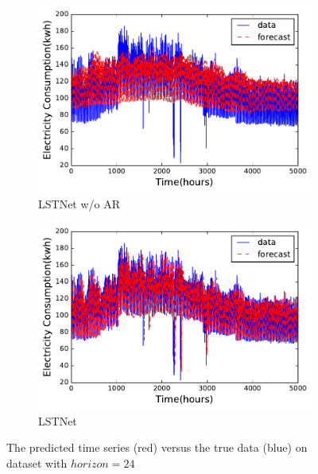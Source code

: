 \begin{figure}[!ht]
\begin{subfigure}{.23\textwidth}
  \centering
  \includegraphics[width=\linewidth]{fig/woar.pdf}
  \caption{LSTNet w/o AR}
\end{subfigure}
\begin{subfigure}{.23\textwidth}
  \centering
  \includegraphics[width=\linewidth]{fig/war.pdf}
  \caption{LSTNet}
\end{subfigure}
\caption{The predicted time series (red) versus the true data (blue) on \electricity dataset with $horizon = 24$}
\label{fig:electricity}
\end{figure}

